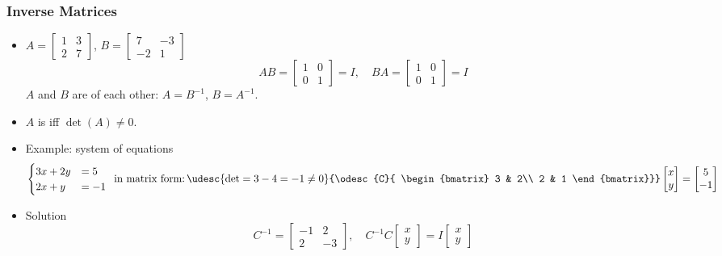 \documentclass[8pt]{beamer}
\newcommand{\myemph}[1]{{\color{blue}{#1}}}
\begin{document}
\begin{frame}
  \frametitle{Inverse Matrices}
  \begin{itemize}
  \item $A =
    \begin{bmatrix}
      1 & 3\\ 2 & 7
    \end{bmatrix}
    $,
    $B =
    \begin{bmatrix}
    7 & -3 \\
    -2 & 1
    \end{bmatrix}
    $
    $$
    AB =
    \begin{bmatrix}
      1 & 0 \\0 & 1
    \end{bmatrix} = I,\quad BA =
    \begin{bmatrix}
      1 & 0\\
      0 & 1
    \end{bmatrix}
    = I
    $$
    $A$ and $B$ are \myemph{inverse} of each other: $A = B^{-1}$, $B = A^{-1}$.
  \item $A$ is \myemph{invertible} iff $\det(A) \not= 0$.
  \item Example: system of equations
    $$
    \begin{cases}
      3x + 2y &=5\\
      2x + y &=-1
    \end{cases}\,\text{ in matrix form:}\,
    \udesc{\det=3-4 = -1\not=0}{\odesc{C}{
    \begin{bmatrix}
      3 & 2\\ 2 & 1
    \end{bmatrix}}}
    \begin{bmatrix}
      x \\ y
    \end{bmatrix}=
    \begin{bmatrix}
      5 \\ -1
    \end{bmatrix}
    $$
  \item Solution
    $$
    C^{-1} =
    \begin{bmatrix}
      -1 & 2\\2 & -3
    \end{bmatrix},\quad
    C^{-1}C
    \begin{bmatrix}
      x\\y  
    \end{bmatrix} = 
    I
    \begin{bmatrix}
      x\\y

\end{bmatrix}$$
\end{itemize}
\end{frame}
\end{document}
